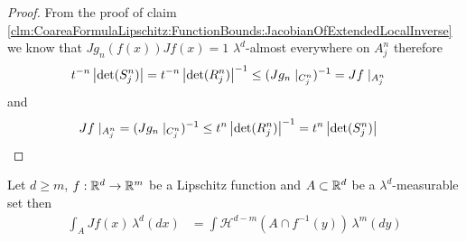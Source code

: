 \begin{proof}
From the proof of claim \ref{clm:CoareaFormulaLipschitz:FunctionBounds:JacobianOfExtendedLocalInverse}  we know that
$J g_n(f(x)) J f(x) = 1$ $\lambda^d$-almost everywhere on $A^n_j$ therefore
\begin{align*}
t^{-n} \left \vert \det(S^n_j) \right \vert &=t^{-n} \left \vert \det(R^n_j) \right \vert^{-1} \leq (J g_n \mid_{C^n_j})^{-1} = J f \mid_{A^n_j}
\end{align*}
and
\begin{align*}
J f \mid_{A^n_j} &= (J g_n \mid_{C^n_j})^{-1} \leq t^n \left \vert \det(R^n_j) \right \vert^{-1} = t^{n} \left \vert \det(S^n_j) \right \vert
\end{align*}
\end{proof}

\begin{thm}\label{CoareaFormulaLipschitz}Let $d \geq m$, $f : \mathbb{R}^d \to \mathbb{R}^m$ be a Lipschitz function and $A \subset \mathbb{R}^d$ be a
$\lambda^d$-measurable set then
\begin{align*}
\int_A Jf(x) \, \lambda^d(dx) &= \int \mathcal{H}^{d-m}(A \cap f^{-1}(y)) \, \lambda^m(dy)
\end{align*}
\end{thm}
